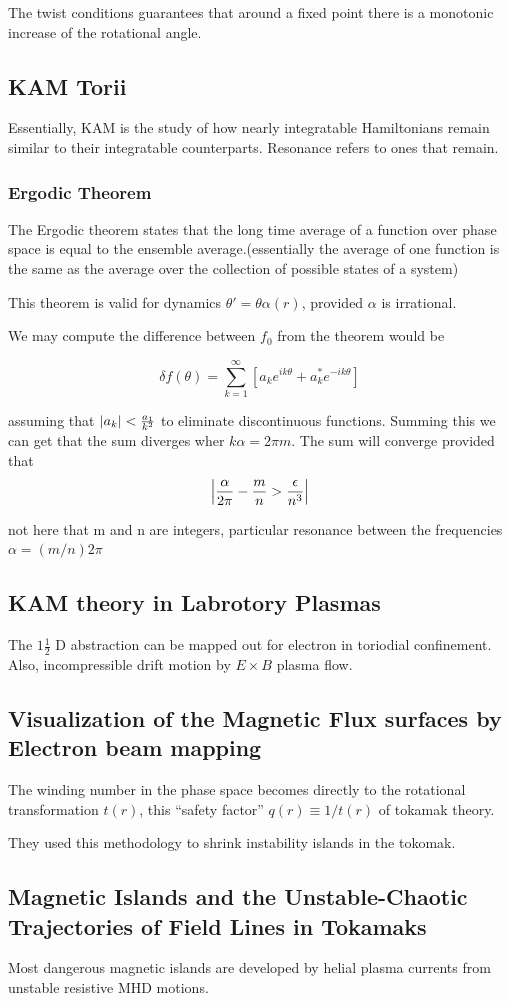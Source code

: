   The twist conditions guarantees that around a fixed point there is a monotonic increase of the rotational angle.


\subsection{KAM Torii}

Essentially, KAM is the study of how nearly integratable Hamiltonians remain similar to their integratable counterparts. Resonance refers to ones that remain.

\subsubsection{Ergodic Theorem}

The Ergodic theorem states that the long time average of a function over phase space is equal to the ensemble average.(essentially the average of one function is the same as the average over the collection of possible states of a system)

This theorem is valid for dynamics $\theta ' = \theta \alpha(r)$, provided $\alpha$ is irrational.

We may compute the difference between $f_0$ from the theorem would be

\[
\delta f(\theta) = \sum_{k=1}^\infty \left[a_k e^{ik\theta} + a^{*}_ke^{-ik\theta}  \right]
  \]

  assuming that $\abs{a_k} < \frac{a_1}{k^2}$ to eliminate discontinuous functions. Summing this we can get that the sum diverges wher $k \alpha = 2 \pi m$. The sum will converge provided that
\[
\abs{\frac{\alpha}{2 \pi} - \frac{m}{n} > \frac{\epsilon}{n^3}}
  \]

  not here that m and n are integers, particular resonance between the frequencies $\alpha = (m/n)2 \pi$
\subsection{KAM theory in Labrotory Plasmas}

The $1 \frac{1}{2}$ D abstraction can be mapped out for electron in toriodial confinement. Also, incompressible drift motion by $E \times B$ plasma flow.

\subsection{Visualization of the Magnetic Flux surfaces by Electron beam mapping}

The winding number in the phase space becomes directly to the rotational transformation $t(r)$, this ``safety factor'' $q(r) \equiv 1/t(r)$ of tokamak theory.

They used this methodology to shrink instability islands in the tokomak.

\subsection{Magnetic Islands and the Unstable-Chaotic Trajectories of Field Lines in Tokamaks}
Most dangerous magnetic islands are developed by helial plasma currents from unstable resistive MHD motions.
